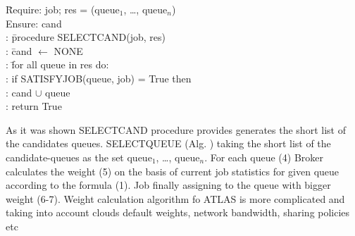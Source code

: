 \begin{tabbing}
\hspace{0.5in}\=
     Require: job; res = (queue$_1$, \ldots, queue$_n$) \\
  \> Ensure: cand \\
  : \hspace{1em}\= procedure SELECT{\textunderscore}CAND(job, res) \\
  :             \> \hspace{1em}\= cand $\leftarrow$ NONE \\
  :             \> \hspace{1em}\= for all queue in res do: \\
  :             \>             \> if SATISFY{\textunderscore}JOB(queue,%
job) = True then \\
  :             \>             \> \hspace{1em} cand $\cup$ queue \\
  :             \>             \> return True
\end{tabbing}

As it was shown SELECT{\textunderscore}CAND procedure provides generates the
short list of the candidates queues. SELECT{\textunderscore}QUEUE (Alg. )
taking the short list of the candidate-queues as the set queue$_1$, \ldots,
queue$_n$. For each queue (4) Broker calculates the weight (5) on the basis of
current job statistics for given queue according to the formula (1). Job
finally assigning to the queue with bigger weight (6-7). Weight calculation
algorithm fo ATLAS is more complicated and taking into account clouds default
weights, network bandwidth, sharing policies etc

